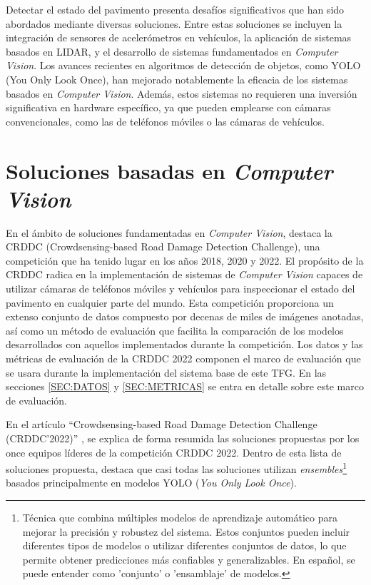 
Detectar el estado del pavimento presenta desafíos significativos que han sido abordados mediante diversas soluciones. Entre estas soluciones se incluyen la integración de sensores de acelerómetros en vehículos\cite{Pavement_Anomalies_Accelerometer}, la aplicación de sistemas basados en LIDAR\cite{LIDAR_Blasiis}\cite{LIDAR_VanDerHorst}, y el desarrollo de sistemas fundamentados en \textit{Computer Vision}. Los avances recientes en algoritmos de detección de objetos, como YOLO (You Only Look Once), han mejorado notablemente la eficacia de los sistemas basados en \textit{Computer Vision}. Además, estos sistemas no requieren una inversión significativa en hardware específico, ya que pueden emplearse con cámaras convencionales, como las de teléfonos móviles o las cámaras de vehículos.

\section{Soluciones basadas en \textit{Computer Vision}}
En el ámbito de soluciones fundamentadas en \textit{Computer Vision}, destaca la CRDDC (Crowdsensing-based Road Damage Detection Challenge), una competición que ha tenido lugar en los años 2018, 2020 y 2022. El propósito de la CRDDC radica en la implementación de sistemas de \textit{Computer Vision} capaces de utilizar cámaras de teléfonos móviles y vehículos para inspeccionar el estado del pavimento en cualquier parte del mundo. Esta competición proporciona un extenso conjunto de datos compuesto por decenas de miles de imágenes anotadas, así como un método de evaluación que facilita la comparación de los modelos desarrollados con aquellos implementados durante la competición. Los datos y las métricas de evaluación de la CRDDC 2022 componen el marco de evaluación que se usara durante la implementación del sistema base de este TFG. En las secciones \ref{SEC:DATOS} y \ref{SEC:METRICAS} se entra en detalle sobre este marco de evaluación.

En el artículo “Crowdsensing-based Road Damage Detection Challenge (CRDDC’2022)” \cite{CRDDC2022_paper}, se explica de forma resumida las soluciones propuestas por los once equipos líderes de la competición CRDDC 2022. Dentro de esta lista de soluciones propuesta, destaca que casi todas las soluciones utilizan \textit{ensembles}\footnote{Técnica que combina múltiples modelos de aprendizaje automático para mejorar la precisión y robustez del sistema. Estos conjuntos pueden incluir diferentes tipos de modelos o utilizar diferentes conjuntos de datos, lo que permite obtener predicciones más confiables y generalizables. En español, se puede entender como 'conjunto' o 'ensamblaje' de modelos.} basados principalmente en modelos YOLO (\textit{You Only Look Once}). 

